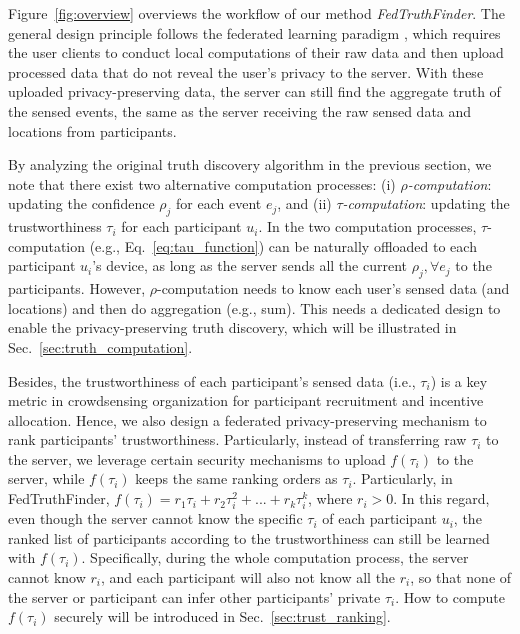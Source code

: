 \documentclass[11pt]{article}
\begin{document}
Figure~\ref{fig:overview} overviews the workflow of our method \textit{FedTruthFinder}. The general design principle follows the federated learning paradigm \cite{Leye-yang2019federated}, which requires the user clients to conduct local computations of their raw data and then upload processed data that do not reveal the user's privacy to the server. With these uploaded privacy-preserving data, the server can still find the aggregate truth of the sensed events, the same as the server receiving the raw sensed data and locations from participants.

By analyzing the original truth discovery algorithm in the previous section, we note that there exist two alternative computation processes: (i) \textit{$\rho$-computation}: updating the confidence $\rho_j$ for each event $e_j$, and (ii) \textit{$\tau$-computation}: updating the trustworthiness $\tau_i$ for each participant $u_i$. In the two computation processes, $\tau$-computation (e.g., Eq.~\ref{eq:tau_function}) can be naturally offloaded to each participant $u_i$'s device, as long as the server sends all the current $\rho_j, \forall e_j$ to the participants. However, $\rho$-computation needs to know each user's sensed data (and locations) and then do aggregation (e.g., sum). This needs a dedicated design to enable the privacy-preserving truth discovery, which will be illustrated in Sec.~\ref{sec:truth_computation}.

Besides, the trustworthiness of each participant's sensed data (i.e., $\tau_i$) is a key metric in crowdsensing organization for participant recruitment and incentive allocation. Hence, we also design a federated privacy-preserving mechanism to rank participants' trustworthiness. Particularly, instead of transferring raw $\tau_i$ to the server, we leverage certain security mechanisms to upload $f(\tau_i)$ to the server, while $f(\tau_i)$ keeps the same ranking orders as $\tau_i$. Particularly, in FedTruthFinder, $f(\tau_i)=r_1\tau_i+r_2\tau_i^2+...+r_k\tau_i^k$, where $r_i>0$.  In this regard, even though the server cannot know the specific $\tau_i$ of each participant $u_i$, the ranked list of participants according to the trustworthiness can still be learned with $f(\tau_i)$. Specifically, during the whole computation process, the server cannot know $r_i$, and each participant will also not know all the $r_i$, so that none of the server or participant can infer other participants' private $\tau_i$. How to compute $f(\tau_i)$ securely will be introduced in Sec.~\ref{sec:trust_ranking}.
\end{document}
